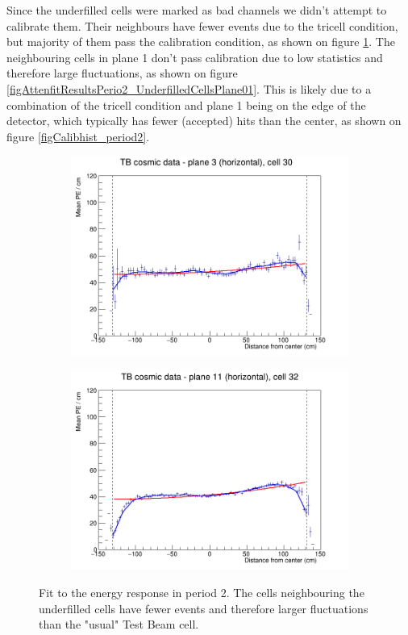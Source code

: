 \documentclass[12pt,a4paper]{article}
\begin{document}
Since the underfilled cells were marked as bad channels we didn't attempt to calibrate them. Their neighbours have fewer events due to the tricell condition, but majority of them pass the calibration condition, as shown on figure \ref{figAttenfitResultsPerio2_UnderfilledCells}. The neighbouring cells in plane 1 don't pass calibration due to low statistics and therefore large fluctuations, as shown on figure \ref{figAttenfitResultsPerio2_UnderfilledCellsPlane01}. This is likely due to a combination of the tricell condition and plane 1 being on the edge of the detector, which typically has fewer (accepted) hits than the center, as shown on figure \ref{figCalibhist_period2}.

\begin{figure}[h]
  \begin{subfigure}{0.5\textwidth}
    \includegraphics[width=\linewidth]{RelativeCalibrationResults/p2_003_030.png}
  \end{subfigure}
  \begin{subfigure}{0.5\textwidth}
    \includegraphics[width=\linewidth]{RelativeCalibrationResults/p2_011_032.png}
  \end{subfigure}
  \caption{Fit to the energy response in period 2. The cells neighbouring the underfilled cells have fewer events and therefore larger fluctuations than the "usual" Test Beam cell.}
  \label{figAttenfitResultsPerio2_UnderfilledCells}
\end{figure}
\end{document}
